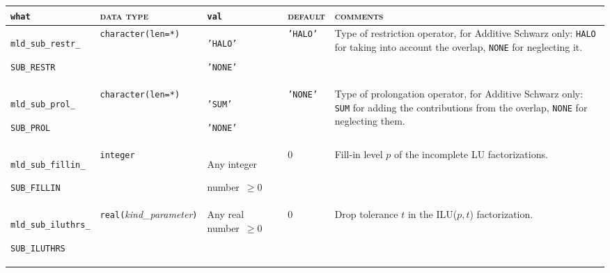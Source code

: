 \bsideways
\begin{center}
\small
\begin{tabular}{|p{3cm}|l|p{2.5cm}|p{2.2cm}|p{7.1cm}|}
\hline
\verb|what|              & \textsc{data type}        &  \verb|val|      &  \textsc{default}  &
\textsc{comments} \\ \hline
\verb|mld_sub_restr_|  \par \verb|SUB_RESTR|   & \verb|character(len=*)|
                         & \texttt{'HALO'} \par \texttt{'NONE'}
                         & \texttt{'HALO'}
                         & Type of restriction operator,  for Additive Schwarz only:
                           \texttt{HALO} for taking into account the overlap, \texttt{NONE} 
                           for neglecting it. \\ \hline
\verb|mld_sub_prol_| \par \verb|SUB_PROL|   & \verb|character(len=*)|
                         & \texttt{'SUM'} \par \texttt{'NONE'}
                         & \texttt{'NONE'}
                         & Type of prolongation operator, for Additive Schwarz only:
                           \texttt{SUM} for adding the contributions from the overlap, \texttt{NONE}
                           for neglecting them.   \\ \hline
\verb|mld_sub_fillin_| \par \verb|SUB_FILLIN|  & \verb|integer|
                         & Any integer \par number~$\ge 0$
                         & 0
                         & Fill-in level $p$ of the incomplete LU factorizations. \\ \hline
\verb|mld_sub_iluthrs_| \par \verb|SUB_ILUTHRS|  & \verb|real(|\emph{kind\_parameter}\verb|)|
                         & Any real number~$\ge 0$
                         & 0
                         & Drop tolerance $t$ in the ILU($p,t$) factorization. \\ %
\hline
\end{tabular}
\end{center}
